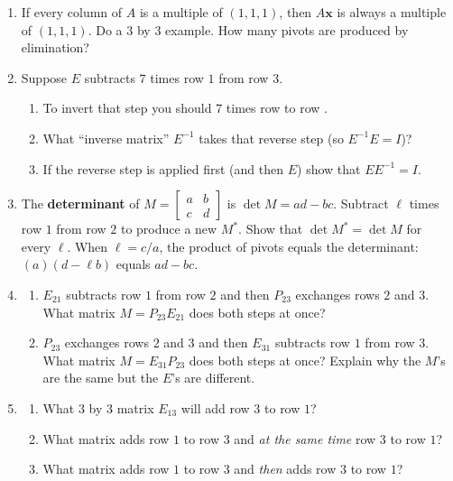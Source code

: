 \documentclass[14pt, a4paper]{article}
\begin{document}
\begin{enumerate}
    \item If every column of $A$ is a multiple of $(1,1,1)$, then $A\boldsymbol{x}$ is always a multiple of $(1,1,1)$. Do a $3$ by $3$ example. How many pivots are produced by elimination?

    \item Suppose $E$ subtracts $7$ times row $1$ from row $3$.
          \begin{enumerate}
              \item To invert that step you should \underline{\hspace{2em}} $7$ times row \underline{\hspace{2em}} to row \underline{\hspace{2em}}.
              \item What ``inverse matrix'' $E^{-1}$ takes that reverse step (so $E^{-1}E = I$)?
              \item If the reverse step is applied first (and then $E$) show that $EE^{-1} = I$.
          \end{enumerate}

    \item The \textbf{determinant} of $M = \begin{bmatrix} a & b \\ c & d \end{bmatrix}$ is $\det M = ad - bc$. Subtract $\ell$ times row $1$ from row $2$ to produce a new $M^*$. Show that $\det M^* = \det M$ for every $\ell$. When $\ell = c/a$, the product of pivots equals the determinant: $(a)(d - \ell b)$ equals $ad - bc$.

    \item
          \begin{enumerate}
              \item $E_{21}$ subtracts row $1$ from row $2$ and then $P_{23}$ exchanges rows $2$ and $3$. What matrix $M = P_{23}E_{21}$ does both steps at once?
              \item $P_{23}$ exchanges rows $2$ and $3$ and then $E_{31}$ subtracts row $1$ from row $3$. What matrix $M = E_{31}P_{23}$ does both steps at once? Explain why the $M$'s are the same but the $E$'s are different.
          \end{enumerate}

    \item
          \begin{enumerate}
              \item What $3$ by $3$ matrix $E_{13}$ will add row $3$ to row $1$?
              \item What matrix adds row $1$ to row $3$ and \textit{at the same time} row $3$ to row $1$?
              \item What matrix adds row $1$ to row $3$ and \textit{then} adds row $3$ to row $1$?
          \end{enumerate}


\end{enumerate}
\end{document}
